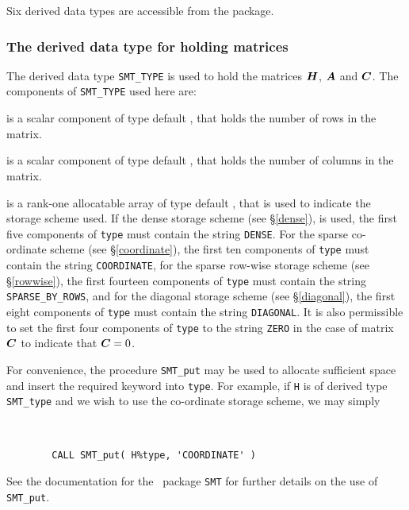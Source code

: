 \documentclass{galahad}
\begin{document}

\galtypes
Six derived data types are accessible from the package.


\subsubsection{The derived data type for holding matrices}\label{typesmt}
The derived data type {\tt SMT\_TYPE} is used to hold the matrices ${\bm{H}}$,
${\bm{A}}$ and ${\bm{C}}$. The components of {\tt SMT\_TYPE} used here are:

\begin{description}

 is a scalar component of type default \integer, 
that holds the number of rows in the matrix. 
 
 is a scalar component of type default \integer, 
that holds the number of columns in the matrix. 
 
 is a rank-one allocatable array of type default \character, that
is used to indicate the storage scheme used. If the dense storage scheme 
(see \S\ref{dense}), is used, 
the first five components of {\tt type} must contain the
string {\tt DENSE}.
For the sparse co-ordinate scheme (see \S\ref{coordinate}), 
the first ten components of {\tt type} must contain the
string {\tt COORDINATE},  
for the sparse row-wise storage scheme (see \S\ref{rowwise}),
the first fourteen components of {\tt type} must contain the
string {\tt SPARSE\_BY\_ROWS},
and for the diagonal storage scheme (see \S\ref{diagonal}),
the first eight components of {\tt type} must contain the
string {\tt DIAGONAL}. It is also permissible to set
the first four components of {\tt type} to the string
{\tt ZERO} in the case of matrix ${\bm{C}}$ to indicate that ${\bm{C}} = 0$.

For convenience, the procedure {\tt SMT\_put} 
may be used to allocate sufficient space and insert the required keyword
into {\tt type}.
For example, if {\tt H} is of derived type {\tt SMT\_type}
and we wish to use the co-ordinate storage scheme, we may simply
{\tt 
\begin{verbatim}
        CALL SMT_put( H%type, 'COORDINATE' )
\end{verbatim}
}
\noindent
See the documentation for the \galahad\ package {\tt SMT} 
for further details on the use of {\tt SMT\_put}.


\end{description}
\end{document}
